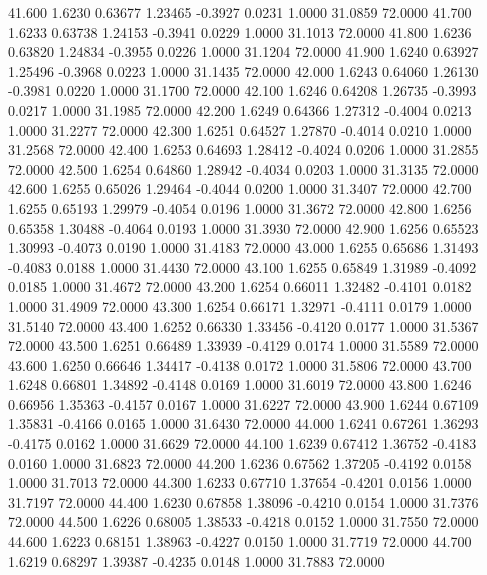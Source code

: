   41.600   1.6230   0.63677   1.23465  -0.3927   0.0231   1.0000  31.0859  72.0000
  41.700   1.6233   0.63738   1.24153  -0.3941   0.0229   1.0000  31.1013  72.0000
  41.800   1.6236   0.63820   1.24834  -0.3955   0.0226   1.0000  31.1204  72.0000
  41.900   1.6240   0.63927   1.25496  -0.3968   0.0223   1.0000  31.1435  72.0000
  42.000   1.6243   0.64060   1.26130  -0.3981   0.0220   1.0000  31.1700  72.0000
  42.100   1.6246   0.64208   1.26735  -0.3993   0.0217   1.0000  31.1985  72.0000
  42.200   1.6249   0.64366   1.27312  -0.4004   0.0213   1.0000  31.2277  72.0000
  42.300   1.6251   0.64527   1.27870  -0.4014   0.0210   1.0000  31.2568  72.0000
  42.400   1.6253   0.64693   1.28412  -0.4024   0.0206   1.0000  31.2855  72.0000
  42.500   1.6254   0.64860   1.28942  -0.4034   0.0203   1.0000  31.3135  72.0000
  42.600   1.6255   0.65026   1.29464  -0.4044   0.0200   1.0000  31.3407  72.0000
  42.700   1.6255   0.65193   1.29979  -0.4054   0.0196   1.0000  31.3672  72.0000
  42.800   1.6256   0.65358   1.30488  -0.4064   0.0193   1.0000  31.3930  72.0000
  42.900   1.6256   0.65523   1.30993  -0.4073   0.0190   1.0000  31.4183  72.0000
  43.000   1.6255   0.65686   1.31493  -0.4083   0.0188   1.0000  31.4430  72.0000
  43.100   1.6255   0.65849   1.31989  -0.4092   0.0185   1.0000  31.4672  72.0000
  43.200   1.6254   0.66011   1.32482  -0.4101   0.0182   1.0000  31.4909  72.0000
  43.300   1.6254   0.66171   1.32971  -0.4111   0.0179   1.0000  31.5140  72.0000
  43.400   1.6252   0.66330   1.33456  -0.4120   0.0177   1.0000  31.5367  72.0000
  43.500   1.6251   0.66489   1.33939  -0.4129   0.0174   1.0000  31.5589  72.0000
  43.600   1.6250   0.66646   1.34417  -0.4138   0.0172   1.0000  31.5806  72.0000
  43.700   1.6248   0.66801   1.34892  -0.4148   0.0169   1.0000  31.6019  72.0000
  43.800   1.6246   0.66956   1.35363  -0.4157   0.0167   1.0000  31.6227  72.0000
  43.900   1.6244   0.67109   1.35831  -0.4166   0.0165   1.0000  31.6430  72.0000
  44.000   1.6241   0.67261   1.36293  -0.4175   0.0162   1.0000  31.6629  72.0000
  44.100   1.6239   0.67412   1.36752  -0.4183   0.0160   1.0000  31.6823  72.0000
  44.200   1.6236   0.67562   1.37205  -0.4192   0.0158   1.0000  31.7013  72.0000
  44.300   1.6233   0.67710   1.37654  -0.4201   0.0156   1.0000  31.7197  72.0000
  44.400   1.6230   0.67858   1.38096  -0.4210   0.0154   1.0000  31.7376  72.0000
  44.500   1.6226   0.68005   1.38533  -0.4218   0.0152   1.0000  31.7550  72.0000
  44.600   1.6223   0.68151   1.38963  -0.4227   0.0150   1.0000  31.7719  72.0000
  44.700   1.6219   0.68297   1.39387  -0.4235   0.0148   1.0000  31.7883  72.0000
